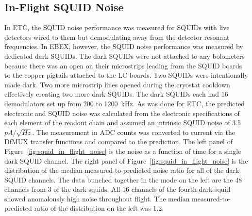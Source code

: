 

\subsection{In-Flight SQUID Noise}
\label{sec:flight_squid_noise}

In \ac{ETC}, the \ac{SQUID} noise performance was measured for \ac{SQUID}s with live detectors wired to them but demodulating away from the detector resonant frequencies. 
In \ac{EBEX}, however, the \ac{SQUID} noise performance was measured by dedicated dark \ac{SQUID}s. 
The dark \ac{SQUID}s were not attached to any bolometers because there was an open on their microstrips leading from the \ac{SQUID} boards to the copper pigtails attached to the \ac{LC} boards. 
Two \ac{SQUID}s were intentionally made dark. 
Two more microstrip lines opened during the cryostat cooldown effectively creating two more dark \ac{SQUID}s. 
The dark \ac{SQUID}s each had 16 demodulators set up from 200 to 1200~kHz.
As was done for \ac{ETC}, the predicted electronic and \ac{SQUID} noise was calculated from the electronic specifications of each element of the readout chain and assumed an intrinsic \ac{SQUID} noise of 3.5~$pA/\sqrt{Hz}$. 
The measurement in \ac{ADC} counts was converted to current via the \ac{DfMUX} transfer functions and compared to the prediction. 
The left panel of Figure~\ref{fig:squid_in_flight_noise} is the noise as a function of time for a single dark \ac{SQUID} channel. 
The right panel of Figure~\ref{fig:squid_in_flight_noise} is the distribution of the median measured-to-predicted noise ratio for all of the dark \ac{SQUID} channels. 
The data bunched together in the mode on the left are the 48 channels from 3 of the dark squids. 
All 16 channels of the fourth dark squid showed anomalously high noise throughout flight. 
The median measured-to-predicted ratio of the distribution on the left was 1.2. 

